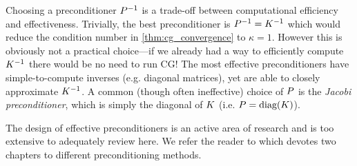 

Choosing a preconditioner $P^{-1}$ is a trade-off between computational efficiency and effectiveness.
Trivially, the best preconditioner is $P^{-1} = K^{-1}$ which would reduce the condition number in \cref{thm:cg_convergence} to $\kappa = 1$.
However this is obviously not a practical choice---if we already had a way to efficiently compute $K^{-1}$ there would be no need to run CG!
The most effective preconditioners have simple-to-compute inverses (e.g. diagonal matrices), yet are able to closely approximate $K^{-1}$.
A common (though often ineffective) choice of $P$ is the \emph{Jacobi preconditioner}, which is simply the diagonal of $K$ (i.e. $P = \text{diag}(K)$).

The design of effective preconditioners is an active area of research and is too extensive to adequately review here.
We refer the reader to \cite{saad2003iterative} which devotes two chapters to different preconditioning methods.



